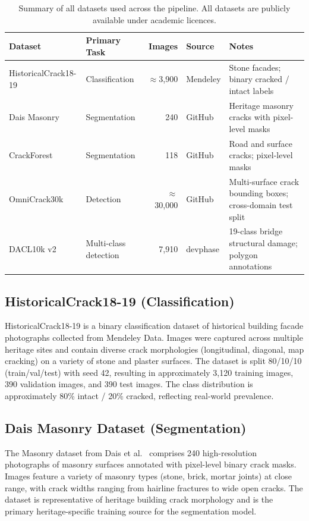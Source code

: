 \documentclass[12pt,a4paper]{article}
\begin{document}
\begin{table}[H]
\centering
\caption{Summary of all datasets used across the pipeline. All datasets are publicly available under academic licences.}
\label{tab:datasets}
\begin{tabular}{p{3.0cm}p{2.6cm}rp{1.4cm}p{3.8cm}}
\toprule
\rowcolor{white}
\textbf{Dataset} & \textbf{Primary Task} & \textbf{Images} & \textbf{Source} & \textbf{Notes} \\
\midrule
HistoricalCrack18-19 & Classification & $\approx$3,900 & Mendeley & Stone facades; binary cracked / intact labels \\
Dais Masonry & Segmentation & 240 & GitHub & Heritage masonry cracks with pixel-level masks \\
CrackForest & Segmentation & 118 & GitHub & Road and surface cracks; pixel-level masks \\
OmniCrack30k & Detection & $\approx$30,000 & GitHub & Multi-surface crack bounding boxes; cross-domain test split \\
DACL10k v2 & Multi-class detection & 7,910 & devphase & 19-class bridge structural damage; polygon annotations \\
\bottomrule
\end{tabular}
\end{table}

\subsection{HistoricalCrack18-19 (Classification)}

HistoricalCrack18-19 is a binary classification dataset of historical building facade photographs collected from Mendeley Data. Images were captured across multiple heritage sites and contain diverse crack morphologies (longitudinal, diagonal, map cracking) on a variety of stone and plaster surfaces. The dataset is split 80/10/10 (train/val/test) with seed 42, resulting in approximately 3,120 training images, 390 validation images, and 390 test images. The class distribution is approximately 80\% intact / 20\% cracked, reflecting real-world prevalence.

\subsection{Dais Masonry Dataset (Segmentation)}

The Masonry dataset from Dais et al.~\cite{dais2021} comprises 240 high-resolution photographs of masonry surfaces annotated with pixel-level binary crack masks. Images feature a variety of masonry types (stone, brick, mortar joints) at close range, with crack widths ranging from hairline fractures to wide open cracks. The dataset is representative of heritage building crack morphology and is the primary heritage-specific training source for the segmentation model.
\end{document}
